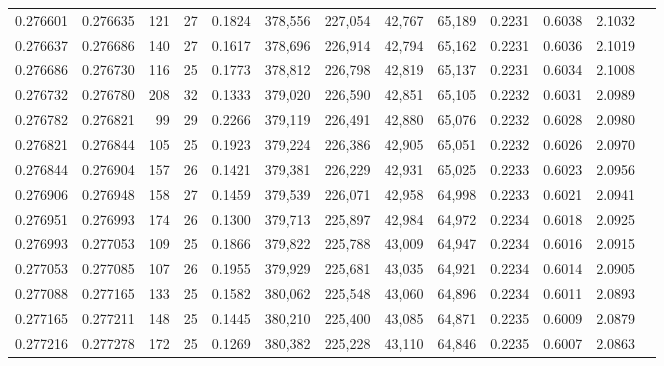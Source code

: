 \begin{tabular}{rrrrrrrrrrrrr}
0.276601 & 0.276635 &   121 &  27 &                                     0.1824 & 378,556 & 227,054 &  42,767 &  65,189 & 0.2231 & 0.6038 & 2.1032 \\
0.276637 & 0.276686 &   140 &  27 &                                     0.1617 & 378,696 & 226,914 &  42,794 &  65,162 & 0.2231 & 0.6036 & 2.1019 \\
0.276686 & 0.276730 &   116 &  25 &                                     0.1773 & 378,812 & 226,798 &  42,819 &  65,137 & 0.2231 & 0.6034 & 2.1008 \\
0.276732 & 0.276780 &   208 &  32 &                                     0.1333 & 379,020 & 226,590 &  42,851 &  65,105 & 0.2232 & 0.6031 & 2.0989 \\
0.276782 & 0.276821 &    99 &  29 &                                     0.2266 & 379,119 & 226,491 &  42,880 &  65,076 & 0.2232 & 0.6028 & 2.0980 \\
0.276821 & 0.276844 &   105 &  25 &                                     0.1923 & 379,224 & 226,386 &  42,905 &  65,051 & 0.2232 & 0.6026 & 2.0970 \\
0.276844 & 0.276904 &   157 &  26 &                                     0.1421 & 379,381 & 226,229 &  42,931 &  65,025 & 0.2233 & 0.6023 & 2.0956 \\
0.276906 & 0.276948 &   158 &  27 &                                     0.1459 & 379,539 & 226,071 &  42,958 &  64,998 & 0.2233 & 0.6021 & 2.0941 \\
0.276951 & 0.276993 &   174 &  26 &                                     0.1300 & 379,713 & 225,897 &  42,984 &  64,972 & 0.2234 & 0.6018 & 2.0925 \\
0.276993 & 0.277053 &   109 &  25 &                                     0.1866 & 379,822 & 225,788 &  43,009 &  64,947 & 0.2234 & 0.6016 & 2.0915 \\
0.277053 & 0.277085 &   107 &  26 &                                     0.1955 & 379,929 & 225,681 &  43,035 &  64,921 & 0.2234 & 0.6014 & 2.0905 \\
0.277088 & 0.277165 &   133 &  25 &                                     0.1582 & 380,062 & 225,548 &  43,060 &  64,896 & 0.2234 & 0.6011 & 2.0893 \\
0.277165 & 0.277211 &   148 &  25 &                                     0.1445 & 380,210 & 225,400 &  43,085 &  64,871 & 0.2235 & 0.6009 & 2.0879 \\
0.277216 & 0.277278 &   172 &  25 &                                     0.1269 & 380,382 & 225,228 &  43,110 &  64,846 & 0.2235 & 0.6007 & 2.0863 \\

\end{tabular}
